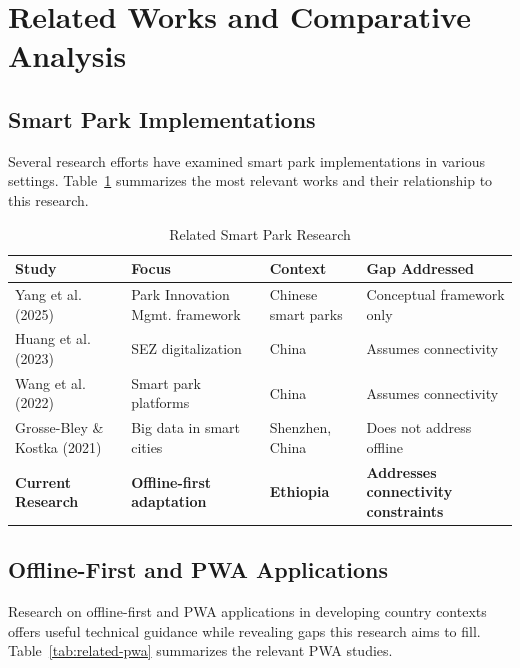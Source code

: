 \section{Related Works and Comparative Analysis}

\subsection{Smart Park Implementations}

Several research efforts have examined smart park implementations in various settings. Table~\ref{tab:related-smart-park} summarizes the most relevant works and their relationship to this research.

\begin{table}[H]
\centering
\caption{Related Smart Park Research}
\label{tab:related-smart-park}
\begin{tabular}{p{3.5cm}p{2.5cm}p{3.0cm}p{3.0cm}}
\toprule
\textbf{Study} & \textbf{Focus} & \textbf{Context} & \textbf{Gap Addressed} \\
\midrule
Yang et al. (2025) & Park Innovation Mgmt. framework & Chinese smart parks & Conceptual framework only \\
Huang et al. (2023) & SEZ digitalization & China & Assumes connectivity \\
Wang et al. (2022) & Smart park platforms & China & Assumes connectivity \\
Grosse-Bley \& Kostka (2021) & Big data in smart cities & Shenzhen, China & Does not address offline \\
\textbf{Current Research} & \textbf{Offline-first adaptation} & \textbf{Ethiopia} & \textbf{Addresses connectivity constraints} \\
\bottomrule
\end{tabular}
\end{table}

\subsection{Offline-First and PWA Applications}

Research on offline-first and PWA applications in developing country contexts offers useful technical guidance while revealing gaps this research aims to fill. Table~\ref{tab:related-pwa} summarizes the relevant PWA studies.

